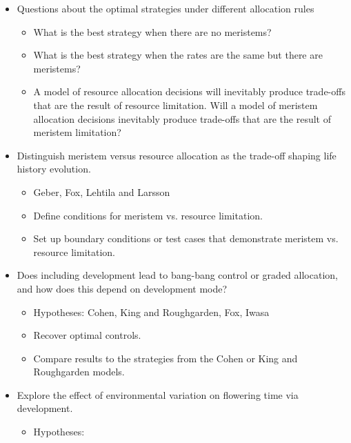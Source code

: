 \documentclass[12pt, oneside,titlepage]{article}   	%
\begin{document}
\begin{itemize}
\item Questions about the optimal strategies under different allocation rules
\begin{itemize}
\item What is the best strategy when there are no meristems? 
\item What is the best strategy when the rates are the same but there are meristems? 
\item A model of resource allocation decisions will inevitably produce trade-offs that are the result of resource limitation. Will a model of meristem allocation decisions inevitably produce trade-offs that are the result of meristem limitation? 
\end{itemize}

\item Distinguish meristem versus resource allocation as the trade-off shaping life history evolution.
\begin{itemize}
\item Geber, Fox, Lehtila and Larsson
\item Define conditions for meristem vs. resource limitation.
\item Set up boundary conditions or test cases that demonstrate meristem vs. resource limitation.
\end{itemize}

\item Does including development lead to bang-bang control or graded allocation, and how does this depend on development mode?
\begin{itemize}
\item Hypotheses: Cohen, King and Roughgarden, Fox, Iwasa 
\item Recover optimal controls.
\item Compare results to the strategies from the Cohen or King and Roughgarden models. 
\end{itemize}

\item Explore the effect of environmental variation on flowering time via development.
\begin{itemize}
\item Hypotheses: \cite{wyatt1982,stebbins1974,prusinkiewicz2007}
\end{itemize}


\end{itemize}
\end{document}
